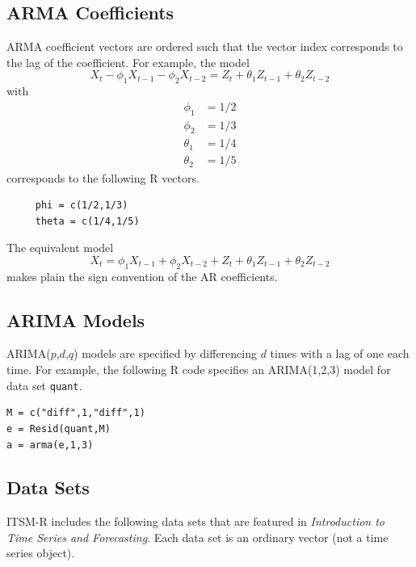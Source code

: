 \documentclass[12pt]{article}
\begin{document}
\subsection{ARMA Coefficients}
ARMA coefficient vectors are ordered such that
the vector index corresponds to the lag of the coefficient.
For example, the model
\[
X_t-\phi_1X_{t-1}-\phi_2X_{t-2}=Z_t+\theta_1Z_{t-1}+\theta_2Z_{t-2}
\]
with
\begin{align*}
\phi_1&=1/2\\
\phi_2&=1/3\\
\theta_1&=1/4\\
\theta_2&=1/5
\end{align*}
corresponds to the following R vectors.

\begin{verbatim}
     phi = c(1/2,1/3)
     theta = c(1/4,1/5)
\end{verbatim}

The equivalent model
\[
X_t=\phi_1X_{t-1}+\phi_2X_{t-2}
+Z_t+\theta_1Z_{t-1}+\theta_2Z_{t-2}
\]
makes plain the sign convention of the AR coefficients.

\subsection{ARIMA Models}
ARIMA($p$,$d$,$q$)
models are specified by differencing $d$ times with a lag of one each time.
For example, the following R code specifies an ARIMA(1,2,3) model
for data set {\tt quant}.

\begin{verbatim}
M = c("diff",1,"diff",1)
e = Resid(quant,M)
a = arma(e,1,3)
\end{verbatim}

\subsection{Data Sets}
ITSM-R includes the following data sets that are featured in
{\it Introduction to Time Series and Forecasting}.
Each data set is an ordinary vector (not a time series object).
\end{document}
